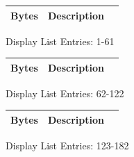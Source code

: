 %
%
\clearpage
\begin{minipage}[b]{0.31\linewidth}
  \begin{figure}[H]
    {
      \setlength{\tabcolsep}{3.0pt}
      \setlength\cmidrulewidth{\heavyrulewidth} %
      \begin{adjustbox}{height=8.5cm}

        \begin{tabular}{lll}
          \toprule
          Bytes       & Description                                                         \\
          \midrule
          
        \end{tabular}

      \end{adjustbox}

    }\caption*{Display List Entries: 1-61}
  \end{figure}
\end{minipage}
\hspace{0.1cm}
\begin{minipage}[b]{0.31\linewidth}
  \begin{figure}[H]
    {
      \setlength{\tabcolsep}{3.0pt}
      \setlength\cmidrulewidth{\heavyrulewidth} %
      \begin{adjustbox}{height=8.5cm}

        \begin{tabular}{lll}
          \toprule
          Bytes       & Description                                                         \\
          \midrule
        \end{tabular}

      \end{adjustbox}

    }\caption*{Display List Entries: 62-122}
  \end{figure}
\end{minipage}
\hspace{0.1cm}
\begin{minipage}[b]{0.31\linewidth}
  \begin{figure}[H]
    {
      \setlength{\tabcolsep}{3.0pt}
      \setlength\cmidrulewidth{\heavyrulewidth} %
      \begin{adjustbox}{height=8.5cm}

        \begin{tabular}{lll}
          \toprule
          Bytes       & Description                                                         \\
          \midrule
        \end{tabular}

      \end{adjustbox}

    }\caption*{Display List Entries: 123-182}
  \end{figure}
\end{minipage}

